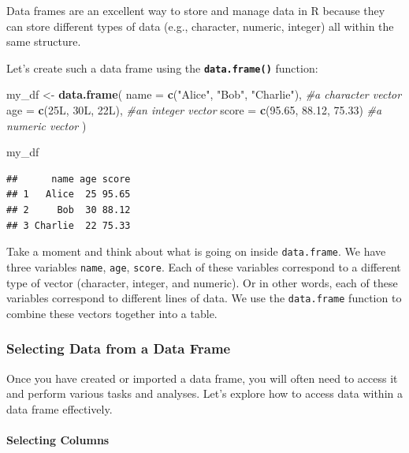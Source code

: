 \documentclass[
]{book}
\newenvironment{Shaded}{\begin{snugshade}}{\end{snugshade}}
\newcommand{\AttributeTok}[1]{\textcolor[rgb]{0.13,0.29,0.53}{#1}}
\newcommand{\CommentTok}[1]{\textcolor[rgb]{0.56,0.35,0.01}{\textit{#1}}}
\newcommand{\DataTypeTok}[1]{\textcolor[rgb]{0.13,0.29,0.53}{#1}}
\newcommand{\DecValTok}[1]{\textcolor[rgb]{0.00,0.00,0.81}{#1}}
\newcommand{\FloatTok}[1]{\textcolor[rgb]{0.00,0.00,0.81}{#1}}
\newcommand{\FunctionTok}[1]{\textcolor[rgb]{0.13,0.29,0.53}{\textbf{#1}}}
\newcommand{\NormalTok}[1]{#1}
\newcommand{\OtherTok}[1]{\textcolor[rgb]{0.56,0.35,0.01}{#1}}
\newcommand{\StringTok}[1]{\textcolor[rgb]{0.31,0.60,0.02}{#1}}
\begin{document}
Data frames are an excellent way to store and manage data in R because they can store different types of data (e.g., character, numeric, integer) all within the same structure.

Let's create such a data frame using the \textbf{\texttt{data.frame()}} function:

\begin{Shaded}
\begin{Highlighting}[]
\NormalTok{my\_df }\OtherTok{\textless{}{-}} \FunctionTok{data.frame}\NormalTok{(}
  \AttributeTok{name =} \FunctionTok{c}\NormalTok{(}\StringTok{"Alice"}\NormalTok{, }\StringTok{"Bob"}\NormalTok{, }\StringTok{"Charlie"}\NormalTok{), }\CommentTok{\#a character vector}
  \AttributeTok{age =} \FunctionTok{c}\NormalTok{(}\DecValTok{25}\DataTypeTok{L}\NormalTok{, }\DecValTok{30}\DataTypeTok{L}\NormalTok{, }\DecValTok{22}\DataTypeTok{L}\NormalTok{), }\CommentTok{\#an integer vector}
  \AttributeTok{score =} \FunctionTok{c}\NormalTok{(}\FloatTok{95.65}\NormalTok{, }\FloatTok{88.12}\NormalTok{, }\FloatTok{75.33}\NormalTok{) }\CommentTok{\#a numeric vector}
\NormalTok{)}

\NormalTok{my\_df}
\end{Highlighting}
\end{Shaded}

\begin{verbatim}
##      name age score
## 1   Alice  25 95.65
## 2     Bob  30 88.12
## 3 Charlie  22 75.33
\end{verbatim}

Take a moment and think about what is going on inside \texttt{data.frame}. We have three variables \texttt{name}, \texttt{age}, \texttt{score}. Each of these variables correspond to a different type of vector (character, integer, and numeric). Or in other words, each of these variables correspond to different lines of data. We use the \texttt{data.frame} function to combine these vectors together into a table.

\subsubsection{Selecting Data from a Data Frame}\label{selecting-data-from-a-data-frame}

Once you have created or imported a data frame, you will often need to access it and perform various tasks and analyses. Let's explore how to access data within a data frame effectively.

\paragraph{Selecting Columns}\label{selecting-columns}
\end{document}
